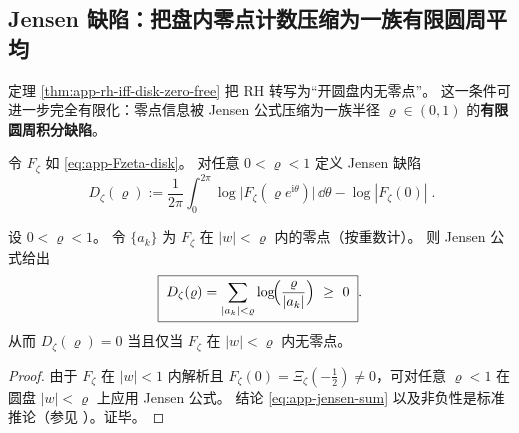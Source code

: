 \subsection{Jensen 缺陷：把盘内零点计数压缩为一族有限圆周平均}\label{subsec:unit-disk-jensen-defect}
定理 \ref{thm:app-rh-iff-disk-zero-free} 把 RH 转写为“开圆盘内无零点”。
这一条件可进一步完全有限化：零点信息被 Jensen 公式压缩为一族半径 \(\varrho\in(0,1)\) 的\textbf{有限圆周积分缺陷}。

\begin{definition}[Jensen 缺陷]\label{def:app-jensen-defect}
令 \(F_{\zeta}\) 如 \eqref{eq:app-Fzeta-disk}。
对任意 \(0<\varrho<1\) 定义 Jensen 缺陷
\begin{equation}\label{eq:app-jensen-defect}
\boxed{\;
D_{\zeta}(\varrho)
:=\frac{1}{2\pi}\int_{0}^{2\pi}\log\bigl|F_{\zeta}(\varrho e^{\mathrm{i}\theta})\bigr|\,\dd\theta
-\log|F_{\zeta}(0)|\; }.
\end{equation}
\end{definition}

\begin{proposition}\label{prop:app-jensen-formula-defect}
设 \(0<\varrho<1\)。
令 \(\{a_k\}\) 为 \(F_{\zeta}\) 在 \(|w|<\varrho\) 内的零点（按重数计）。
则 Jensen 公式给出
\begin{equation}\label{eq:app-jensen-sum}
\boxed{\;
D_{\zeta}(\varrho)
=\sum_{|a_k|<\varrho}\log\!\Bigl(\frac{\varrho}{|a_k|}\Bigr)\ \ge\ 0\; }.
\end{equation}
从而 \(D_{\zeta}(\varrho)=0\) 当且仅当 \(F_{\zeta}\) 在 \(|w|<\varrho\) 内无零点。
\end{proposition}
\begin{proof}
由于 \(F_{\zeta}\) 在 \(|w|<1\) 内解析且 \(F_{\zeta}(0)=\Xi_{\zeta}(-\tfrac12)\neq 0\)，可对任意 \(\varrho<1\) 在圆盘 \(|w|<\varrho\) 上应用 Jensen 公式。
结论 \eqref{eq:app-jensen-sum} 以及非负性是标准推论（参见 \cite{Duren1970TheoryHp}）。证毕。
\end{proof}

